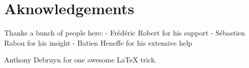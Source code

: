 \chapter*{Aknowledgements}

Thanks a bunch of people here:
- Frédéric Robert for his support
- Sébastien Rabou for his insight
- Batien Heneffe for his extensive help

Anthony Debruyn for one awesome LaTeX trick.